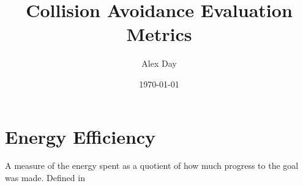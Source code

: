 \documentclass[11pt]{article}
\author{Alex Day}
\date{\today}
\title{Collision Avoidance Evaluation Metrics}
\begin{document}
\maketitle
\tableofcontents


\section{Energy Efficiency}
\label{sec:org601c537}
A measure of the energy spent as a quotient of how much progress to the goal was made. Defined in \cite{godoy2014anytime,godoy2020c} 
\end{document}
